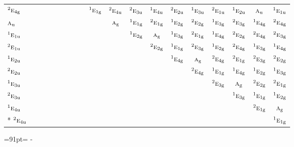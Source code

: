 \documentclass[10pt,a4paper]{article}
\newcommand{\needspace}[1]{\par\penalty-100\begingroup\dimen0=#1\relax\dimen2=\pagegoal
  \advance\dimen2-\pagetotal\ifdim\dimen0>\dimen2\relax\ifdim\dimen2>0pt\vfil\break\fi\fi
  \endgroup}
\numberwithin{equation}{section}
\newcommand{\irr}[1]{\text{\normalfont\scshape #1}}
\newcommand{\conjpair}[1]{{}^{#1}}
\newcommand{\ptag}[1]{\mathrm{#1}}
\begin{document}
{\begin{longtable}{@{}lcccccccccccccccccc@{}}
$\conjpair{2}\irr{e}_{4\ptag{g}}$ &  &  &  &  &  &  &  &  & $\conjpair{1}\irr{e}_{1\ptag{g}}$ & $\conjpair{2}\irr{e}_{4\ptag{u}}$ & $\conjpair{2}\irr{e}_{3\ptag{u}}$ & $\conjpair{1}\irr{e}_{4\ptag{u}}$ & $\conjpair{2}\irr{e}_{2\ptag{u}}$ & $\conjpair{1}\irr{e}_{3\ptag{u}}$ & $\conjpair{2}\irr{e}_{1\ptag{u}}$ & $\conjpair{1}\irr{e}_{2\ptag{u}}$ & $\irr{a}_{\ptag{u}}$ & $\conjpair{1}\irr{e}_{1\ptag{u}}$\\
$\irr{a}_{\ptag{u}}$ &  &  &  &  &  &  &  &  &  & $\irr{a}_{\ptag{g}}$ & $\conjpair{1}\irr{e}_{1\ptag{g}}$ & $\conjpair{2}\irr{e}_{1\ptag{g}}$ & $\conjpair{1}\irr{e}_{2\ptag{g}}$ & $\conjpair{2}\irr{e}_{2\ptag{g}}$ & $\conjpair{1}\irr{e}_{3\ptag{g}}$ & $\conjpair{2}\irr{e}_{3\ptag{g}}$ & $\conjpair{1}\irr{e}_{4\ptag{g}}$ & $\conjpair{2}\irr{e}_{4\ptag{g}}$\\
$\conjpair{1}\irr{e}_{1\ptag{u}}$ &  &  &  &  &  &  &  &  &  &  & $\conjpair{1}\irr{e}_{2\ptag{g}}$ & $\irr{a}_{\ptag{g}}$ & $\conjpair{1}\irr{e}_{3\ptag{g}}$ & $\conjpair{2}\irr{e}_{1\ptag{g}}$ & $\conjpair{1}\irr{e}_{4\ptag{g}}$ & $\conjpair{2}\irr{e}_{2\ptag{g}}$ & $\conjpair{2}\irr{e}_{4\ptag{g}}$ & $\conjpair{2}\irr{e}_{3\ptag{g}}$\\
$\conjpair{2}\irr{e}_{1\ptag{u}}$ &  &  &  &  &  &  &  &  &  &  &  & $\conjpair{2}\irr{e}_{2\ptag{g}}$ & $\conjpair{1}\irr{e}_{1\ptag{g}}$ & $\conjpair{2}\irr{e}_{3\ptag{g}}$ & $\conjpair{1}\irr{e}_{2\ptag{g}}$ & $\conjpair{2}\irr{e}_{4\ptag{g}}$ & $\conjpair{1}\irr{e}_{3\ptag{g}}$ & $\conjpair{1}\irr{e}_{4\ptag{g}}$\\
$\conjpair{1}\irr{e}_{2\ptag{u}}$ &  &  &  &  &  &  &  &  &  &  &  &  & $\conjpair{1}\irr{e}_{4\ptag{g}}$ & $\irr{a}_{\ptag{g}}$ & $\conjpair{2}\irr{e}_{4\ptag{g}}$ & $\conjpair{2}\irr{e}_{1\ptag{g}}$ & $\conjpair{2}\irr{e}_{3\ptag{g}}$ & $\conjpair{2}\irr{e}_{2\ptag{g}}$\\
$\conjpair{2}\irr{e}_{2\ptag{u}}$ &  &  &  &  &  &  &  &  &  &  &  &  &  & $\conjpair{2}\irr{e}_{4\ptag{g}}$ & $\conjpair{1}\irr{e}_{1\ptag{g}}$ & $\conjpair{1}\irr{e}_{4\ptag{g}}$ & $\conjpair{1}\irr{e}_{2\ptag{g}}$ & $\conjpair{1}\irr{e}_{3\ptag{g}}$\\
$\conjpair{1}\irr{e}_{3\ptag{u}}$ &  &  &  &  &  &  &  &  &  &  &  &  &  &  & $\conjpair{2}\irr{e}_{3\ptag{g}}$ & $\irr{a}_{\ptag{g}}$ & $\conjpair{2}\irr{e}_{2\ptag{g}}$ & $\conjpair{2}\irr{e}_{1\ptag{g}}$\\
$\conjpair{2}\irr{e}_{3\ptag{u}}$ &  &  &  &  &  &  &  &  &  &  &  &  &  &  &  & $\conjpair{1}\irr{e}_{3\ptag{g}}$ & $\conjpair{1}\irr{e}_{1\ptag{g}}$ & $\conjpair{1}\irr{e}_{2\ptag{g}}$\\
$\conjpair{1}\irr{e}_{4\ptag{u}}$ &  &  &  &  &  &  &  &  &  &  &  &  &  &  &  &  & $\conjpair{2}\irr{e}_{1\ptag{g}}$ & $\irr{a}_{\ptag{g}}$\\*
$\conjpair{2}\irr{e}_{4\ptag{u}}$ &  &  &  &  &  &  &  &  &  &  &  &  &  &  &  &  &  & $\conjpair{1}\irr{e}_{1\ptag{g}}$\\
\bottomrule\end{longtable}}
\needspace{91pt}
\end{document}
